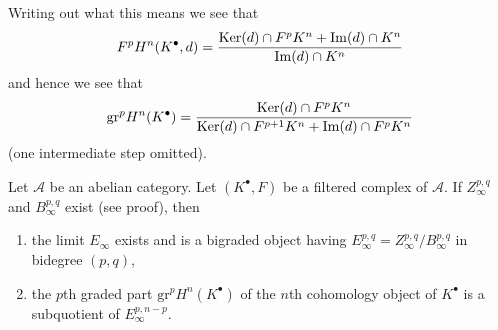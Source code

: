 \noindent
Writing out what this means we see that
\begin{equation}
\label{equation-filtration-cohomology}
F^pH^n(K^\bullet, d) =
\frac{\mathop{\mathrm{Ker}}(d) \cap F^pK^n + \mathop{\mathrm{Im}}(d) \cap K^n}{\mathop{\mathrm{Im}}(d) \cap K^n}
\end{equation}
and hence we see that
\begin{equation}
\label{equation-graded-cohomology}
\text{gr}^p H^n(K^\bullet) =
\frac{\mathop{\mathrm{Ker}}(d) \cap F^pK^n}{\mathop{\mathrm{Ker}}(d) \cap F^{p + 1}K^n + \mathop{\mathrm{Im}}(d) \cap F^pK^n}
\end{equation}
(one intermediate step omitted).

\begin{lemma}
\label{lemma-compute-cohomology-filtered-complex}
Let $\mathcal{A}$ be an abelian category. Let $(K^\bullet, F)$ be a filtered
complex of $\mathcal{A}$. If $Z_\infty^{p, q}$ and $B_\infty^{p, q}$ exist
(see proof), then
\begin{enumerate}
\item the limit $E_\infty$ exists and is a bigraded object having
$E_\infty^{p, q} = Z_\infty^{p, q}/B_\infty^{p, q}$ in bidegree $(p, q)$,
\item the $p$th graded part $\text{gr}^pH^n(K^\bullet)$ of the
$n$th cohomology object of $K^\bullet$ is a subquotient of
$E_\infty^{p, n - p}$.
\end{enumerate}
\end{lemma}

